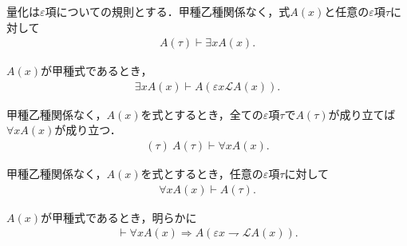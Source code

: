 	量化は$\varepsilon$項についての規則とする．甲種乙種関係なく，式$A(x)$と任意の$\varepsilon$項$\tau$に対して
	\begin{align}
		A(\tau) \vdash \exists x A(x).
	\end{align}
	
	$A(x)$が甲種式であるとき，
	\begin{align}
		\exists x A(x) \vdash A\left(\varepsilon x \mathcal{L}A(x)\right).
	\end{align}
	
	甲種乙種関係なく，$A(x)$を式とするとき，全ての$\varepsilon$項$\tau$で$A(\tau)$が成り立てば$\forall x A(x)$が成り立つ．
	\begin{align}
		(\tau)\ A(\tau) \vdash \forall x A(x).
	\end{align}
	
	甲種乙種関係なく，$A(x)$を式とするとき，任意の$\varepsilon$項$\tau$に対して
	\begin{align}
		\forall x A(x) \vdash A(\tau).
	\end{align}
	
	$A(x)$が甲種式であるとき，明らかに
	\begin{align}
		\vdash \forall x A(x) \Longrightarrow A(\varepsilon x \rightharpoondown \mathcal{L}A(x)).
	\end{align}